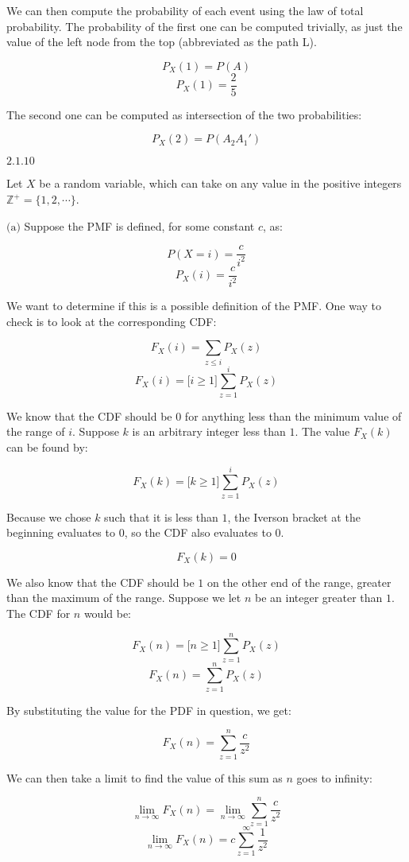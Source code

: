 \documentclass{article}
\newcommand{\problem}[2]{$\boxed{\text{#1.#2}}$}
\newcommand{\subproblem}[3]{$\boxed{\text{(#3)}}$}
\begin{document}
We can then compute the probability of each event using the law of
total probability. The probability of the first one can be computed
trivially, as just the value of the left node from the top
(abbreviated as the path L).

\[
P_X(1)=P(A)
\] \[
P_X(1)=\frac{2}{5}
\]

The second one can be computed as intersection of the two
probabilities:

\[
P_X(2)=P(A_2A_1')
\]

%
\problem{2.1}{10}

Let $X$ be a random variable, which can take on any value in the
positive integers $\mathbb{Z}^+=\{1,2,\cdots\}$.

%
\subproblem{2.1}{10}{a} Suppose the PMF is defined, for some constant
$c$, as:

\[
P(X=i)=\frac{c}{i^2}
\] \[
P_X(i)=\frac{c}{i^2}
\]

We want to determine if this is a possible definition of the PMF. One
way to check is to look at the corresponding CDF:

\[
F_X(i)=\sum\limits_{z\le{}i}P_X(z)
\] \[
F_X(i)=\lbrack i\ge1\rbrack\sum\limits_{z=1}^i P_X(z)
\]

We know that the CDF should be $0$ for anything less than the minimum
value of the range of $i$. Suppose $k$ is an arbitrary integer less
than $1$. The value $F_X(k)$ can be found by:

\[
F_X(k)=\lbrack k\ge 1\rbrack\sum\limits_{z=1}^i P_X(z)
\]

Because we chose $k$ such that it is less than $1$, the Iverson
bracket at the beginning evaluates to $0$, so the CDF also evaluates
to $0$.

\[
F_X(k)=0
\]

We also know that the CDF should be $1$ on the other end of the range,
greater than the maximum of the range. Suppose we let $n$ be an
integer greater than $1$. The CDF for $n$ would be:

\[
F_X(n)=\lbrack n\ge 1\rbrack\sum\limits_{z=1}^n P_X(z)
\] \[
F_X(n)=\sum\limits_{z=1}^n P_X(z)
\]

By substituting the value for the PDF in question, we get:

\[
F_X(n)=\sum\limits_{z=1}^n\frac{c}{z^2}
\]

We can then take a limit to find the value of this sum as $n$ goes to
infinity:

\[
\lim\limits_{n\rightarrow\infty}F_X(n)=\lim\limits_{n\rightarrow\infty}\sum\limits_{z=1}^n\frac{c}{z^2}
\] \[
\lim\limits_{n\rightarrow\infty}F_X(n)=c\sum\limits_{z=1}^\infty\frac{1}{z^2}
\]
\end{document}
